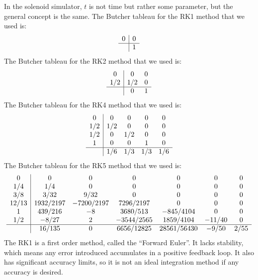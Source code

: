 \documentclass[12pt]{article}
\begin{document}
	In the solenoid simulator, $t$ is not time but rather some parameter, but the general concept is the same. The Butcher tableau for the RK1 method that we used is:
			\[\begin{array}{c|c}
				0 & 0 \\
				\hline
  				  & 1 \\
			\end{array}\]			
	The Butcher tableau for the RK2 method that we used is:	
			\[\begin{array}{c|cc}
				0   & 0   & 0  \\
				1/2 & 1/2 & 0  \\
				\hline
    				& 0   & 1  \\
			\end{array}\]			
	The Butcher tableau for the RK4 method that we used is:
			\[\begin{array}{c|cccc}
				0   & 0   & 0   & 0   & 0\\
				1/2 & 1/2 & 0   & 0   & 0\\
				1/2 & 0   & 1/2 & 0   & 0\\
				1   & 0   & 0   & 1   & 0\\
				\hline
    				& 1/6 & 1/3 & 1/3 & 1/6\\
			\end{array}\]
	The Butcher tableau for the RK5 method that we used is:
			\[\begin{array}{c|cccccc}
				0     & 0         & 0          & 0           & 0          & 0        & 0\\
				1/4   & 1/4       & 0          & 0           & 0          & 0        & 0\\
				3/8   & 3/32      & 9/32       & 0           & 0          & 0        & 0\\
				12/13 & 1932/2197 & -7200/2197 & 7296/2197   & 0          & 0        & 0\\
				1     & 439/216   & -8         & 3680/513    & -845/4104  & 0        & 0\\
				1/2   & -8/27     & 2          & -3544/2565  & 1859/4104  & -11/40   & 0\\
				\hline
    		          & 16/135    & 0          & 6656/12825  & 28561/56430&-9/50     & 2/55\\
			\end{array}\]
	The RK1 is a first order method, called the ``Forward Euler''. It lacks stability, which means any error introduced accumulates in a positive feedback loop. It also has significant accuracy limits, so it is not an ideal integration method if any accuracy is desired.
	
\end{document}
